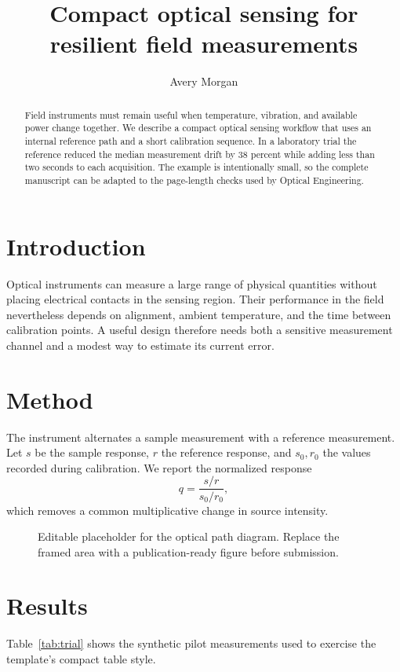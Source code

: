 \documentclass[10pt,letterpaper]{article}
\begin{document}
\title{Compact optical sensing for resilient field measurements}
\author{Avery Morgan}
\address{Centre for Applied Photonics, Northbridge Institute}

\begin{abstract}
Field instruments must remain useful when temperature, vibration, and available
power change together. We describe a compact optical sensing workflow that uses
an internal reference path and a short calibration sequence. In a laboratory
trial the reference reduced the median measurement drift by 38 percent while
adding less than two seconds to each acquisition. The example is intentionally
small, so the complete manuscript can be adapted to the page-length checks used
by Optical Engineering.
\end{abstract}

\section{Introduction}
Optical instruments can measure a large range of physical quantities without
placing electrical contacts in the sensing region. Their performance in the
field nevertheless depends on alignment, ambient temperature, and the time
between calibration points. A useful design therefore needs both a sensitive
measurement channel and a modest way to estimate its current error.

\section{Method}
The instrument alternates a sample measurement with a reference measurement.
Let $s$ be the sample response, $r$ the reference response, and $s_0,r_0$ the
values recorded during calibration. We report the normalized response
\begin{equation}
  q = \frac{s/r}{s_0/r_0},
  \label{eq:normalized-response}
\end{equation}
which removes a common multiplicative change in source intensity.

\begin{figure}[t]
  \centering
  \fbox{\rule{0pt}{28mm}\rule{0.82\columnwidth}{0pt}}
  \caption{Editable placeholder for the optical path diagram. Replace the
  framed area with a publication-ready figure before submission.}
  \label{fig:path}
\end{figure}

\section{Results}
Table~\ref{tab:trial} shows the synthetic pilot measurements used to exercise
the template's compact table style.
\end{document}
